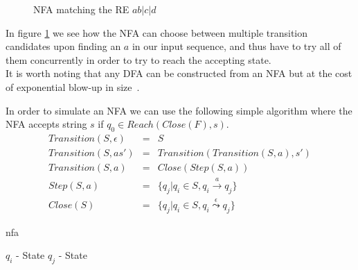 \documentclass[12pt]{article}
\theoremstyle{definition}
\begin{document}
\begin{figure}[H]
  \begin{center}

	
	\caption{NFA matching the RE \underline{$ab|c|d$}}
	\label{nfa_simple}
  \end{center}
\end{figure}

In figure \ref{nfa_simple} we see how the NFA can choose between multiple transition candidates upon finding an $a$ in our input sequence, and thus have to try all of them concurrently in order to try to reach the accepting state. \\
It is worth noting that any DFA can be constructed from an NFA but at the cost of exponential blow-up in size~\cite{nfa-to-dfa}.

In order to simulate an NFA we can use the following simple algorithm where the NFA accepts string $s$ if $q_0 \in Reach(Close(F), s)$.
\begin{eqnarray}
	Transition(S, \epsilon) & = & S \\
	Transition(S, as') & = & Transition(Transition(S, a), s') \\
	Transition(S, a) & = & Close(Step(S, a)) \\
	Step(S, a) & = & \{ q_j | q_i \in S, q_i \xrightarrow{a} q_j \} \\
	Close(S) & = & \{ q_j | q_i \in S, q_i \overset{\epsilon}{\leadsto} q_j \}
\end{eqnarray}

\begin{spacing}{0.8}
\begin{algorithm}[H]
	\caption{nfa}
	\label{alg:nfa}
  	\begin{algorithmic}[1]
    		\Require
    			\Statex $q_i$ - State 
    			\Statex $q_j$ - State
				
    		\EndFunction
  	\end{algorithmic}
\end{algorithm}
\end{spacing}
\end{document}
